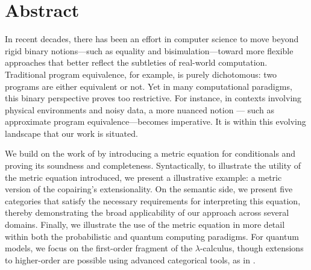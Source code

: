 \chapter*{Abstract}

\begin{comment}
Noisy intermediate-scale quantum (NISQ)  computers are expected to operate with severely limited hardware resources. Precisely controlling qubits in these systems comes at a high cost, is susceptible to errors, and faces scarcity challenges. Therefore, error analysis is indispensable for the design, optimization, and assessment of NISQ computing. Nevertheless, the analysis of errors in quantum programs poses a significant challenge. The overarching goal of the M.Sc. project is to provide a fully-fledged
quantum programming language on which to study metric program equivalence
in various scenarios, such as in quantum algorithmics and quantum information theory.
\end{comment}

In recent decades, there has been an effort in computer science to move beyond rigid binary notions—such as equality and bisimulation—toward more flexible approaches that better reflect the  subtleties of real-world computation. Traditional program equivalence, for example, is purely dichotomous: two programs are either equivalent or not. Yet in many computational paradigms, this binary perspective proves too restrictive. For instance, in contexts involving physical environments and noisy data, a more nuanced notion --- such as approximate program equivalence---becomes imperative. It is within this evolving landscape that our work is situated.

We build on the work of \cite{dahlqvist2023syntactic} by introducing a metric equation for conditionals and proving its soundness and completeness. 
Syntactically, to illustrate the utility of the metric equation introduced, we present a illustrative example: a metric version of the copairing's extensionality. On the semantic side, we present five categories that satisfy the necessary requirements for interpreting this equation, thereby demonstrating the broad applicability of our approach across several domains. Finally, we illustrate the use of the metric equation in more detail within both the probabilistic and quantum computing paradigms. For quantum models, we focus on the first-order fragment of the $\lambda$-calculus, though extensions to higher-order are possible using advanced categorical tools, as in \cite{dahlqvist2023syntactic}. 


